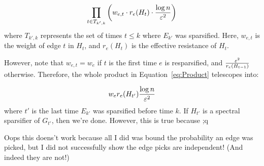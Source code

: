 \begin{align}
\prod_{t \in T_{k', k}}  \left(w_{e, t} \cdot r_e(H_t) \cdot \frac{\log
n}{\varepsilon^2}\right)
\label{eq:Product}
\end{align}
where $T_{k', k}$ represents the set of times $t \leq k$ where $E_{k'}$ was
sparsified. Here, $w_{e,t}$ is the weight of edge $t$ in $H_t$, and
$r_e(H_t)$ is the effective resistance of $H_t$.

However, note that $w_{e,t} = w_e$ if $t$ is the first time $e$ is
resparsified, and $\frac{\varepsilon^2}{r_e(H_{t-1})}$ otherwise. Therefore,
the whole product in Equation~\eqref{eq:Product} telescopes into:

\begin{align}
w_e r_e(H_{t'}) \frac{\log n}{\varepsilon^2}
\label{eq:SimplifiedProduct}
\end{align}
where $t'$ is the last time $E_{k'}$ was sparsified before time $k$.
If $H_{t'}$ is a spectral sparsifier of $G_{t'}$, then we're done.
However, this is true because ;q

Oops this doens't work because all I did was bound the probability an
edge was picked, but I did not successfully show the edge picks are
independent! (And indeed they are not!)



